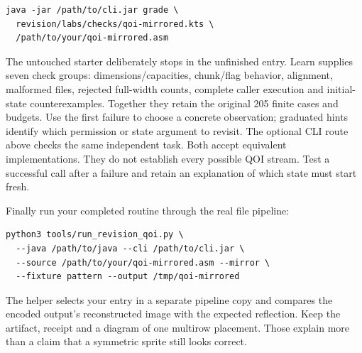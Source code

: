 \begin{verbatim}
java -jar /path/to/cli.jar grade \
  revision/labs/checks/qoi-mirrored.kts \
  /path/to/your/qoi-mirrored.asm
\end{verbatim}
The untouched starter deliberately stops in the unfinished entry. Learn supplies
seven check groups: dimensions/capacities, chunk/flag behavior, alignment, malformed
files, rejected full-width counts, complete caller execution and initial-state
counterexamples. Together they retain the original 205 finite cases and budgets.
Use the first failure to choose a concrete observation; graduated hints identify
which permission or state argument to revisit. The optional CLI route above checks
the same independent task. Both accept equivalent implementations. They do not establish every possible
QOI stream. Test a successful call after a failure and retain an explanation of
which state must start fresh.

Finally run your completed routine through the real file pipeline:
\begin{verbatim}
python3 tools/run_revision_qoi.py \
  --java /path/to/java --cli /path/to/cli.jar \
  --source /path/to/your/qoi-mirrored.asm --mirror \
  --fixture pattern --output /tmp/qoi-mirrored
\end{verbatim}
The helper selects your entry in a separate pipeline copy and compares the
encoded output's reconstructed image with the expected reflection. Keep the
artifact, receipt and a diagram of one multirow placement. Those explain more
than a claim that a symmetric sprite still looks correct.
